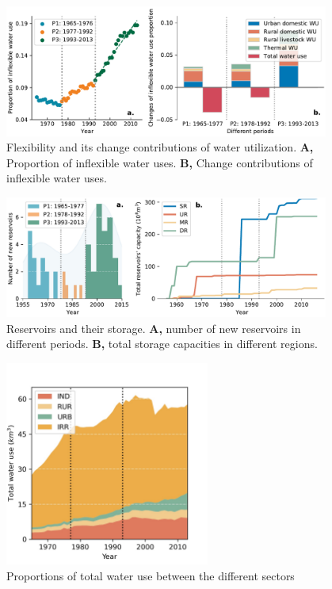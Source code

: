 \documentclass[9pt,twoside,lineno]{pnas-new}
\begin{document}
\begin{figure}
    \centering
    \includegraphics[width=0.95\textwidth]{../../figures/sup/inflexible_wu.pdf}
    \caption{
        Flexibility and its change contributions of water utilization.
        \textbf{A,} Proportion of inflexible water uses.
        \textbf{B,} Change contributions of inflexible water uses.
    }
\end{figure}
    

\begin{figure}
    \centering
    \includegraphics[width=0.95\textwidth]{../../figures/sup/reservoirs.pdf}
    \caption{
        Reservoirs and their storage.
        \textbf{A,} number of new reservoirs in different periods.
        \textbf{B,} total storage capacities in different regions. 
    }
\end{figure}

\begin{figure}
    \centering
    \includegraphics[width=0.6\textwidth]{../../figures/sup/sf_wu_sections_stackplot.jpg}
    \caption{Proportions of total water use between the different sectors}
\end{figure}
\end{document}
